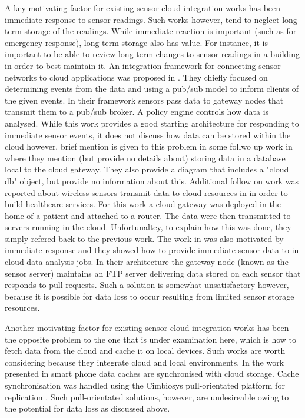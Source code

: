 A key motivating factor for existing sensor-cloud integration works has been immediate response to sensor readings. Such works however, tend to neglect long-term storage of the readings. While immediate reaction is important (such as for emergency response), long-term storage also has value. For instance, it is important to be able to review long-term changes to sensor readings in a building in order to best maintain it. An integration framework for connecting sensor networks to cloud applications was proposed in \cite{hassan2009framework}. They chiefly focused on determining events from the data and using a pub/sub model to inform clients of the given events. In their framework sensors pass data to gateway nodes that transmit them to a pub/sub broker. A policy engine controls how data is analysed. While this work provides a good starting architecture for responding to immediate sensor events, it does not discuss how data can be stored within the cloud however, brief mention is given to this problem in some follwo up work in \cite{5421618} where they mention (but provide no details about) storing data in a database local to the cloud gateway. They also provide a diagram that includes a "cloud db" object, but provide no information about this. Additional follow on work was reported about wireless sensors transmit data to cloud resources in \cite{s111211581} in order to build healthcare services. For this work a cloud gateway was deployed in the home of a patient and attached to a router. The data were then transmitted to servers running in the cloud. Unfortunaltey, to explain how this was done, they simply refered back to the previous work. The work in \cite{melchor2011design} was also motivated by immediate response and they showed how to provide immediate sensor data to in cloud data analysis jobs. In their architecture the gateway node (known as the sensor server) maintains an FTP server delivering data stored on each sensor that responds to pull requests. Such a solution is somewhat unsatisfactory however, because it is possible for data loss to occur resulting from limited sensor storage resources.

Another motivating factor for existing sensor-cloud integration works has been the opposite problem to the one that is under examination here, which is how to fetch data from the cloud and cache it on local devices. Such works are worth considering because they integrate cloud and local environments. In the work presented in \cite{Stuedi:2010:WLD:1810931.1810932} smart phone data caches are synchronised with cloud storage. Cache synchronisation was handled using the Cimbiosys pull-orientated platform for replication \cite{Ramasubramanian09cimbiosys:a}. Such pull-orientated solutions, however, are undesireable owing to the potential for data loss as discussed above.
						
